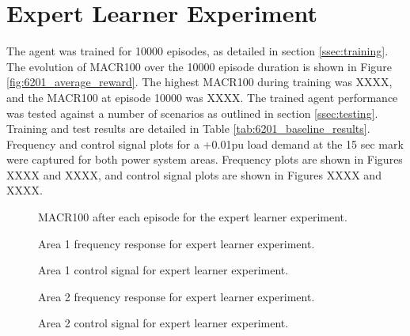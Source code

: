 \section{Expert Learner Experiment}
The agent was trained for 10000 episodes, as detailed in section \ref{ssec:training}. The evolution of MACR100 over the 10000 episode duration is shown in Figure \ref{fig:6201_average_reward}. The highest MACR100 during training was XXXX, and the MACR100 at episode 10000 was XXXX. The trained agent performance was tested against a number of scenarios as outlined in section \ref{ssec:testing}. Training and test results are detailed in Table \ref{tab:6201_baseline_results}. Frequency and control signal plots for a +0.01pu load demand at the 15 sec mark were captured for both power system areas. Frequency plots are shown in Figures XXXX and XXXX, and control signal plots are shown in Figures XXXX and XXXX.

\vspace{2cm}

\begin{figure}[h]
	\centering
	
	\caption{MACR100 after each episode for the expert learner experiment.}
\end{figure}



\begin{figure}[h]
	\centering
	
	
	\vspace{-0.5cm}
	\caption{Area 1 frequency response for expert learner experiment.}
	
	\vspace{0.5cm}
	
	
	\vspace{-0.5cm}
	\caption{Area 1 control signal for expert learner experiment.}
	
	\vspace{0.5cm}
	
	
	\vspace{-0.5cm}
	\caption{Area 2 frequency response for expert learner experiment.}
	
	\vspace{0.5cm}
				
	
	\vspace{-0.5cm}
	\caption{Area 2 control signal for expert learner experiment.}
\end{figure}
